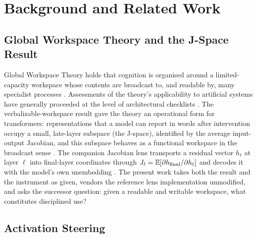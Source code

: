 \section{Background and Related Work}
\label{sec:related}

\subsection{Global Workspace Theory and the J-Space Result}

Global Workspace Theory holds that cognition is organised around a limited-capacity workspace whose contents are broadcast to, and readable by, many specialist processes \cite{Baars1988,Dehaene1998,Mashour2020,Dehaene2014}. Assessments of the theory's applicability to artificial systems have generally proceeded at the level of architectural checklists \cite{Butlin2023}. The verbalizable-workspace result gave the theory an operational form for transformers: representations that a model can report in words after intervention occupy a small, late-layer subspace (the J-space), identified by the average input-output Jacobian, and this subspace behaves as a functional workspace in the broadcast sense \cite{Anthropic2026Workspace}. The companion Jacobian lens transports a residual vector $h_\ell$ at layer $\ell$ into final-layer coordinates through $J_\ell = \mathbb{E}\!\left[\partial h_{\mathrm{final}} / \partial h_\ell\right]$ and decodes it with the model's own unembedding \cite{JacobianLens2026}. The present work takes both the result and the instrument as given, vendors the reference lens implementation unmodified, and asks the successor question: given a readable and writable workspace, what constitutes disciplined use?

\subsection{Activation Steering}

